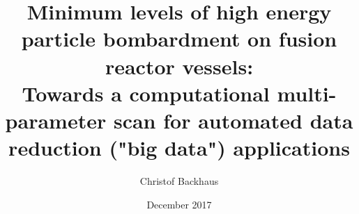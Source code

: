 \documentclass[a4paper,12pt]{book}
\begin{document}
\author{Christof Backhaus}
\title{Minimum levels of high energy particle bombardment on fusion reactor vessels:\\ \large{Towards a computational multi-parameter scan for automated data reduction ("big data") applications}}
\date{December 2017}

\frontmatter
\maketitle
\tableofcontents

\mainmatter







\backmatter


\end{document}
